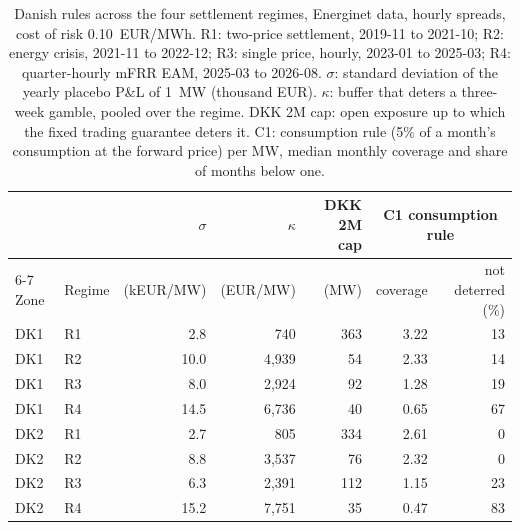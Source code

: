 \begin{table}[!htbp]
\centering
\caption{Danish rules across the four settlement regimes, Energinet data, hourly spreads, cost of risk 0.10~EUR/MWh. R1: two-price settlement, 2019-11 to 2021-10; R2: energy crisis, 2021-11 to 2022-12; R3: single price, hourly, 2023-01 to 2025-03; R4: quarter-hourly mFRR EAM, 2025-03 to 2026-08. $\sigma$: standard deviation of the yearly placebo P\&L of 1~MW (thousand EUR). $\kappa$: buffer that deters a three-week gamble, pooled over the regime. DKK 2M cap: open exposure up to which the fixed trading guarantee deters it. C1: consumption rule (5\% of a month's consumption at the forward price) per MW, median monthly coverage and share of months below one.}
\label{tab:dkregimes}
\scriptsize
\begin{tabular}{@{}llrrrrr@{}}
\toprule
& & $\sigma$ & $\kappa$ & DKK 2M cap & \multicolumn{2}{c}{C1 consumption rule} \\
\cmidrule(l){6-7}
Zone & Regime & (kEUR/MW) & (EUR/MW) & (MW) & coverage & not deterred (\%) \\
\midrule
DK1 & R1 & 2.8 & 740 & 363 & 3.22 & 13 \\
DK1 & R2 & 10.0 & 4,939 & 54 & 2.33 & 14 \\
DK1 & R3 & 8.0 & 2,924 & 92 & 1.28 & 19 \\
DK1 & R4 & 14.5 & 6,736 & 40 & 0.65 & 67 \\
\addlinespace
DK2 & R1 & 2.7 & 805 & 334 & 2.61 & 0 \\
DK2 & R2 & 8.8 & 3,537 & 76 & 2.32 & 0 \\
DK2 & R3 & 6.3 & 2,391 & 112 & 1.15 & 23 \\
DK2 & R4 & 15.2 & 7,751 & 35 & 0.47 & 83 \\
\bottomrule
\end{tabular}
\end{table}
